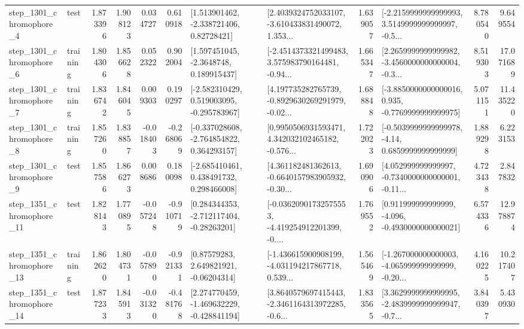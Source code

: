 \begin{tabular}{llrrrrllrlrr}
  step\_1301\_chromophore\_4 &      test &      1.873396 &    1.908123 &      0.034727 &  0.610918 &     [1.513901462, -2.338721406, 0.82728421] &  [2.4039324752033107, -3.610433831490072, 1.353... &       1.639057 &  [-2.2159999999999993, 3.5149999999999997, -0.5... &            8.780540 &          9.649554 \\
  step\_1301\_chromophore\_6 &  training &      1.804306 &    1.856628 &      0.052322 &  0.902004 &      [1.597451045, -2.3648748, 0.189915437] &  [-2.4514373321499483, 3.575983790164481, -0.94... &       1.665347 &  [2.2659999999999982, -3.4560000000000004, -0.3... &            8.519303 &         17.071689 \\
  step\_1301\_chromophore\_7 &  training &      1.836742 &    1.846045 &      0.009303 &  0.190297 &   [-2.582310429, 0.519003095, -0.295783967] &  [4.197735282765739, -0.8929630269291979, -0.02... &       1.688848 &  [-3.8850000000000016, 0.935, -0.7769999999999975] &            5.071151 &         11.435220 \\
  step\_1301\_chromophore\_8 &  training &      1.857260 &    1.838857 &     -0.018403 & -0.268069 &   [-0.337028608, -2.764854822, 0.364293157] &  [0.9950506931593471, 4.342032102465182, -0.576... &       1.722023 &   [-0.5039999999999978, -4.14, 0.6859999999999999] &            1.889298 &          6.223153 \\
  step\_1301\_chromophore\_9 &      test &      1.857586 &    1.866273 &      0.008686 &  0.180098 &    [-2.685410461, 0.438491732, 0.298466008] &  [4.361182481362613, -0.6640157983905932, -0.30... &       1.690906 &  [4.052999999999997, -0.7340000000000001, -0.11... &            4.723438 &          2.847832 \\
 step\_1351\_chromophore\_11 &      test &      1.828143 &    1.770895 &     -0.057248 & -0.910719 &    [0.284344353, -2.712117404, -0.28263201] &  [-0.03620901732575553, -4.419254912201399, -0.... &       1.769552 &   [0.911999999999999, -4.096, -0.4930000000000021] &            6.574336 &         12.978874 \\
 step\_1351\_chromophore\_13 &  training &      1.862620 &    1.804731 &     -0.057890 & -0.921331 &      [0.87579283, 2.649821921, -0.06204314] &  [-1.436615900908199, -4.031194217867718, 0.539... &       1.565469 &  [-1.267000000000003, -4.065999999999999, -0.20... &            4.160225 &         10.217407 \\
 step\_1351\_chromophore\_14 &      test &      1.877233 &    1.845913 &     -0.031320 & -0.481768 &   [2.274770459, -1.469632229, -0.428841194] &  [3.8640579697415443, -2.3461164313972285, -0.6... &       1.833565 &  [3.3629999999999995, -2.4839999999999947, -0.7... &            3.840397 &          5.430930 \\

\end{tabular}
